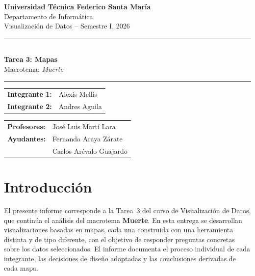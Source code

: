 \documentclass[12pt, letterpaper]{article}
\begin{document}
\begin{titlepage}
  \centering
  \vspace*{1.5cm}

  {\Large\bfseries Universidad Técnica Federico Santa María}\\[0.3cm]
  {\large Departamento de Informática}\\[0.2cm]
  {\large Visualización de Datos -- Semestre I, 2026}

  \vspace{1.5cm}
  \rule{\linewidth}{0.5pt}\\[0.4cm]
  {\LARGE\bfseries Tarea 3: Mapas}\\[0.2cm]
  {\large Macrotema: \textit{Muerte}}
  \rule{\linewidth}{0.5pt}

  \vspace{1.5cm}

  \begin{tabular}{ll}
    \textbf{Integrante 1:} & Alexis Mellis \\[0.2cm]
    \textbf{Integrante 2:} & Andres Aguila \\
  \end{tabular}

  \vspace{1cm}

  \begin{tabular}{ll}
    \textbf{Profesores:}  & José Luis Martí Lara \\[0.2cm]
    \textbf{Ayudantes:}   & Fernanda Araya Zárate \\
                          & Carlos Arévalo Guajardo \\
  \end{tabular}

  \vfill

\end{titlepage}

\tableofcontents
\newpage

\section{Introducción}

El presente informe corresponde a la Tarea~3 del curso de Visualización de Datos, que
continúa el análisis del macrotema \textbf{Muerte}. En esta entrega se desarrollan
visualizaciones basadas en mapas, cada una construida con una herramienta distinta y
de tipo diferente, con el objetivo de responder preguntas concretas sobre los datos
seleccionados. El informe documenta el proceso individual de cada integrante, las
decisiones de diseño adoptadas y las conclusiones derivadas de cada mapa.
\end{document}
